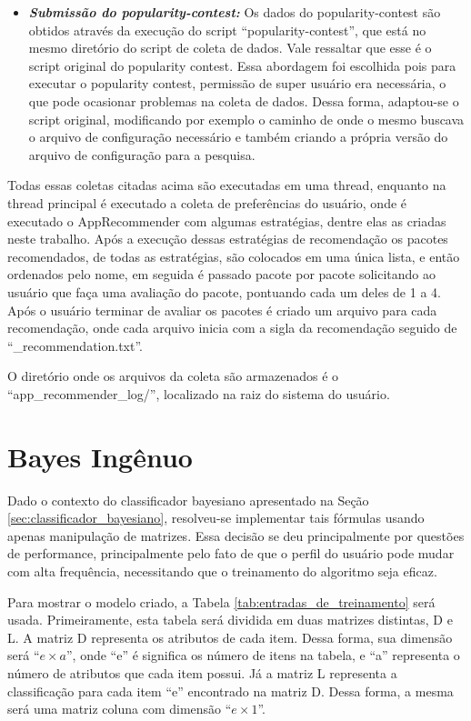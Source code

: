 \begin{anexosenv}
\begin{itemize}
  \item \textit{\textbf{Submissão do popularity-contest:}} Os dados do
  popularity-contest são obtidos através da execução do script ``popularity-contest'',
  que está no mesmo diretório do script de coleta de dados. Vale ressaltar que
  esse é o script original do popularity contest. Essa abordagem foi escolhida
  pois para executar o popularity contest, permissão de super usuário era
  necessária, o que pode ocasionar problemas na coleta de dados. Dessa forma,
  adaptou-se o script original, modificando por exemplo o caminho de onde o
  mesmo buscava o arquivo de configuração necessário e também criando a própria
  versão do arquivo de configuração para a pesquisa.
\end{itemize}

Todas essas coletas citadas acima são executadas em uma thread, enquanto
na thread principal é executado a coleta de preferências do usuário, onde
é executado o AppRecommender com algumas estratégias, dentre elas as criadas
neste trabalho. Após a execução dessas estratégias de recomendação os
pacotes recomendados, de todas as estratégias, são colocados em uma única
lista, e então ordenados pelo nome, em seguida é passado pacote por pacote
solicitando ao usuário que faça uma avaliação do pacote, pontuando cada um
deles de 1 a 4. Após o usuário terminar de avaliar os pacotes é criado um
arquivo para cada recomendação, onde cada arquivo inicia com a sigla da
recomendação seguido de ``\_recommendation.txt''.

O diretório onde os arquivos da coleta são armazenados é o ``app\_recommender\_log/'',
localizado na raiz do sistema do usuário.


\chapter{Bayes Ingênuo} \label{sec:bayes_ingenuo}

Dado o contexto do classificador bayesiano apresentado na Seção
\ref{sec:classificador_bayesiano}, resolveu-se implementar tais fórmulas usando
apenas manipulação de matrizes. Essa decisão se deu principalmente por questões
de performance, principalmente pelo fato de que o perfil do usuário pode mudar
com alta frequência, necessitando que o treinamento do algoritmo seja eficaz.

Para mostrar o modelo criado, a Tabela \ref{tab:entradas_de_treinamento} será
usada. Primeiramente, esta tabela será dividida em duas matrizes distintas, D e
L. A matriz D representa os atributos de cada item. Dessa forma, sua dimensão
será ``${e \times a}$'', onde ``e'' é significa os número de itens na tabela, e
``a'' representa o número de atributos que cada item possui. Já a matriz L
representa a classificação para cada item ``e'' encontrado na matriz D. Dessa
forma, a mesma será uma matriz coluna com dimensão ``${e \times 1}$''.


\end{anexosenv}
